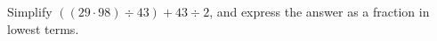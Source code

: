 Simplify $\left((29\cdot98)\div43\right)+43\div2$, and express the answer as a fraction in lowest terms.
